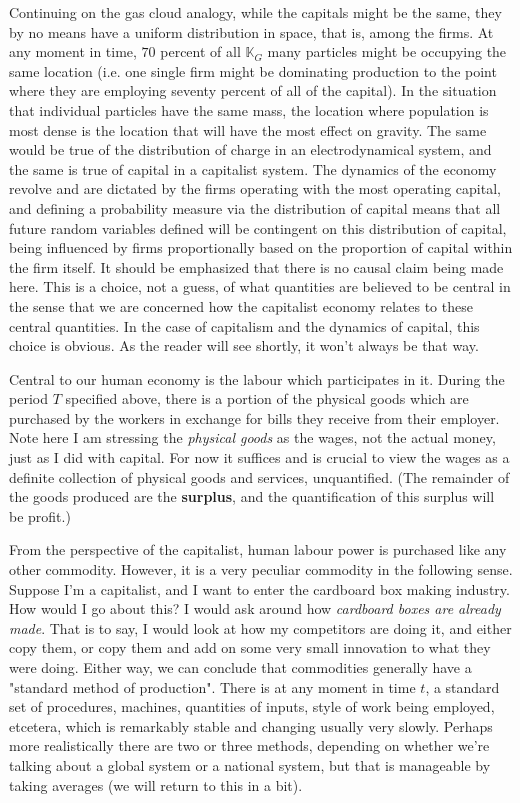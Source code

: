 \documentclass{article}
\theoremstyle{definition}
\theoremstyle{plain}
\theoremstyle{theorem}
\begin{document}
Continuing on the gas cloud analogy, while the capitals might be the same, they by no means have a uniform distribution in space, that is, among the firms. At any moment in time, $70$ percent of all $\mathbb{K}_G$ many particles might be occupying the same location (i.e. one single firm might be dominating production to the point where they are employing seventy percent of all of the capital). In the situation that individual particles have the same mass, the location where population is most dense is the location that will have the most effect on gravity. The same would be true of the distribution of charge in an electrodynamical system, and the same is true of capital in a capitalist system. The dynamics of the economy revolve and are dictated by the firms operating with the most operating capital, and defining a probability measure via the distribution of capital means that all future random variables defined will be contingent on this distribution of capital, being influenced by firms proportionally based on the proportion of capital within the firm itself. It should be emphasized that there is no causal claim being made here. This is a choice, not a guess, of what quantities are believed to be central in the sense that we are concerned how the capitalist economy relates to these central quantities. In the case of capitalism and the dynamics of capital, this choice is obvious. As the reader will see shortly, it won't always be that way.
 \par 
Central to our human economy is the labour which participates in it. During the period $T$ specified above, there is a portion of the physical goods which are purchased by the workers in exchange for bills they receive from their employer. Note here I am stressing the \textit{physical goods} as the wages, not the actual money, just as I did with capital. For now it suffices and is crucial to view the wages as a definite collection of physical goods and services, unquantified. (The remainder of the goods produced are the \textbf{surplus}, and the quantification of this surplus will be profit.) \par 
From the perspective of the capitalist, human labour power is purchased like any other commodity. However, it is a very peculiar commodity in the following sense. Suppose I'm a capitalist, and I want to enter the cardboard box making industry. How would I go about this? I would ask around how \textit{cardboard boxes are already made}. That is to say, I would look at how my competitors are doing it, and either copy them, or copy them and add on some very small innovation to what they were doing. Either way, we can conclude that commodities generally have a "standard method of production". There is at any moment in time $t$, a standard set of procedures, machines, quantities of inputs, style of work being employed, etcetera, which is remarkably stable and changing usually very slowly. Perhaps more realistically there are two or three methods, depending on whether we're talking about a global system or a national system, but that is manageable by taking averages (we will return to this in a bit). \par 
\end{document}
